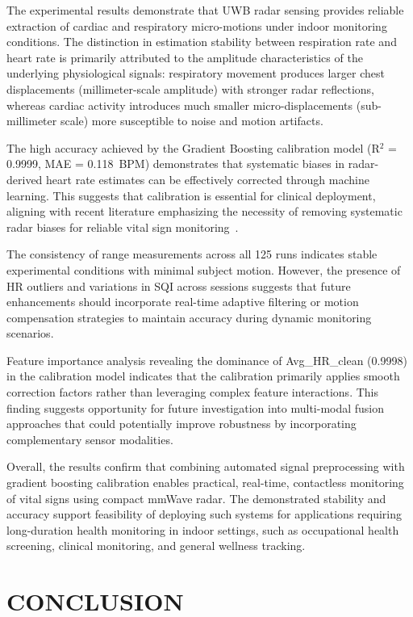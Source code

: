 \documentclass[conference]{IEEEtran}
\begin{document}
The experimental results demonstrate that UWB radar sensing provides reliable extraction of cardiac and respiratory micro-motions under indoor monitoring conditions. The distinction in estimation stability between respiration rate and heart rate is primarily attributed to the amplitude characteristics of the underlying physiological signals: respiratory movement produces larger chest displacements (millimeter-scale amplitude) with stronger radar reflections, whereas cardiac activity introduces much smaller micro-displacements (sub-millimeter scale) more susceptible to noise and motion artifacts.

The high accuracy achieved by the Gradient Boosting calibration model (R$^2$ = 0.9999, MAE = 0.118~BPM) demonstrates that systematic biases in radar-derived heart rate estimates can be effectively corrected through machine learning. This suggests that calibration is essential for clinical deployment, aligning with recent literature emphasizing the necessity of removing systematic radar biases for reliable vital sign monitoring~\cite{ref8}.

The consistency of range measurements across all 125 runs indicates stable experimental conditions with minimal subject motion. However, the presence of HR outliers and variations in SQI across sessions suggests that future enhancements should incorporate real-time adaptive filtering or motion compensation strategies to maintain accuracy during dynamic monitoring scenarios.

Feature importance analysis revealing the dominance of Avg\_HR\_clean (0.9998) in the calibration model indicates that the calibration primarily applies smooth correction factors rather than leveraging complex feature interactions. This finding suggests opportunity for future investigation into multi-modal fusion approaches that could potentially improve robustness by incorporating complementary sensor modalities.

Overall, the results confirm that combining automated signal preprocessing with gradient boosting calibration enables practical, real-time, contactless monitoring of vital signs using compact mmWave radar. The demonstrated stability and accuracy support feasibility of deploying such systems for applications requiring long-duration health monitoring in indoor settings, such as occupational health screening, clinical monitoring, and general wellness tracking.

\section{CONCLUSION}
\end{document}
